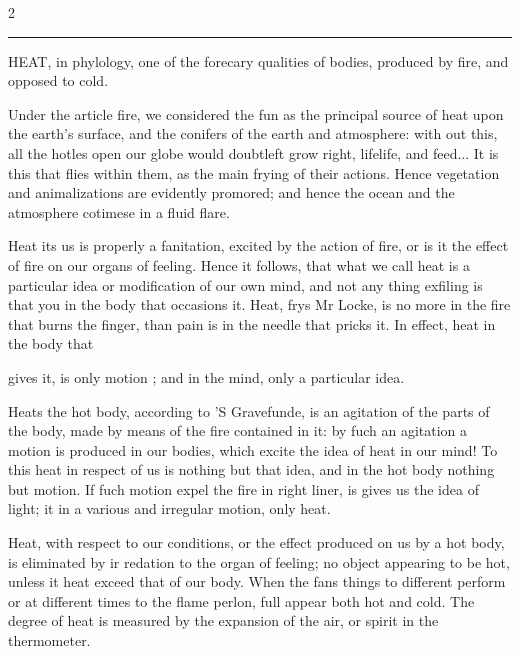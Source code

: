 \documentclass[10pt]{article}
\begin{document}
\begin{multicols}{2}\raggedcolumns
\end{multicols}
\par\vspace{4pt}\noindent\rule{0.3\linewidth}{0.4pt}\par
{\footnotesize
HEAT, in phylology, one of the forecary qualities of bodies, produced by fire, and opposed to cold.

Under the article fire, we considered the fun as the principal source of heat upon the earth's surface, and the conifers of the earth and atmosphere: with out this, all the hotles open our globe would doubtleft grow right, lifelife, and feed... It is this that flies within them, as the main frying of their actions. Hence vegetation and animalizations are evidently promored; and hence the ocean and the atmosphere cotimese in a fluid flare.

Heat its us is properly a fanitation, excited by the action of fire, or is it the effect of fire on our organs of feeling. Hence it follows, that what we call heat is a particular idea or modification of our own mind, and not any thing exfiling is that you in the body that occasions it. Heat, frys Mr Locke, is no more in the fire that burns the finger, than pain is in the needle that pricks it. In effect, heat in the body that

gives it, is only motion ; and in the mind, only a particular idea.

Heats the hot body, according to 'S Gravefunde, is an agitation of the parts of the body, made by means of the fire contained in it: by fuch an agitation a motion is produced in our bodies, which excite the idea of heat in our mind! To this heat in respect of us is nothing but that idea, and in the hot body nothing but motion. If fuch motion expel the fire in right liner, is gives us the idea of light; it in a various and irregular motion, only heat.

Heat, with respect to our conditions, or the effect produced on us by a hot body, is eliminated by ir redation to the organ of feeling; no object appearing to be hot, unless it heat exceed that of our body. When the fans things to different perform or at different times to the flame perlon, full appear both hot and cold. The degree of heat is measured by the expansion of the air, or spirit in the thermometer.\par}
\end{document}
